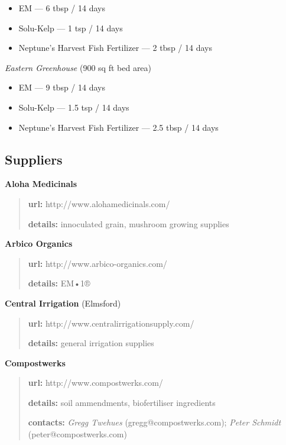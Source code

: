 \begin{itemize}
\itemsep1pt\parskip0pt
\item
  EM --- 6 tbsp / 14 days
\item
  Solu-Kelp --- 1 tsp / 14 days
\item
  Neptune's Harvest Fish Fertilizer --- 2 tbsp / 14 days
\end{itemize}

\emph{Eastern Greenhouse} (900 sq ft bed area)

\begin{itemize}
\itemsep1pt\parskip0pt
\item
  EM --- 9 tbsp / 14 days
\item
  Solu-Kelp --- 1.5 tsp / 14 days
\item
  Neptune's Harvest Fish Fertilizer --- 2.5 tbsp / 14 days
\end{itemize}

\subsection{Suppliers}\label{suppliers}

\textbf{Aloha Medicinals}

\begin{quote}
\textbf{url:} http://www.alohamedicinals.com/

\textbf{details:} innoculated grain, mushroom growing supplies
\end{quote}

\textbf{Arbico Organics}

\begin{quote}
\textbf{url:} http://www.arbico-organics.com/

\textbf{details:} EM•1®
\end{quote}

\textbf{Central Irrigation} (Elmsford)

\begin{quote}
\textbf{url:} http://www.centralirrigationsupply.com/

\textbf{details:} general irrigation supplies
\end{quote}

\textbf{Compostwerks}

\begin{quote}
\textbf{url:} http://www.compostwerks.com/

\textbf{details:} soil ammendments, biofertiliser ingredients

\textbf{contacts:} \emph{Gregg Twehues} (gregg@compostwerks.com);
\emph{Peter Schmidt} (peter@compostwerks.com)
\end{quote}

